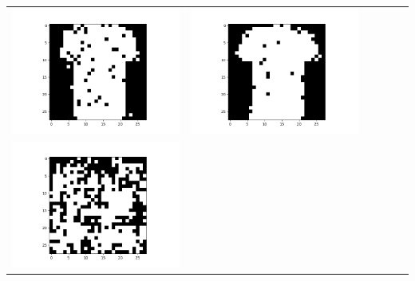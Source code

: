 \documentclass[12pt]{report}
\begin{document}
\begin{table}[H]
\begin{tabular}{  c  c  c  c  c  c }
\begin{minipage}{.15\textwidth}
      \includegraphics[scale=0.2]{BM_a16.png}
    \end{minipage} &
    \begin{minipage}{.15\textwidth}
      \includegraphics[scale=0.2]{BM_a40.png}
    \end{minipage} \\ 
    \begin{minipage}{.15\textwidth}
      \includegraphics[scale=0.2]{BM_bvisual.png}

\end{minipage}
\end{tabular}
\end{table}
\end{document}
